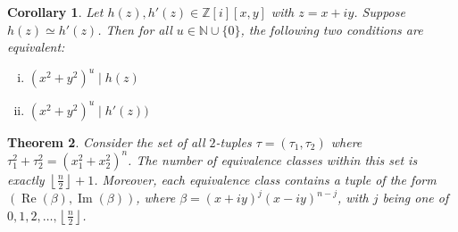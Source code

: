 \documentclass[12pt]{article}
\newtheorem{theorem}{Theorem}[section]
\newtheorem{corollary}[theorem]{Corollary}
\theoremstyle{definition}
\theoremstyle{remark}
\newcommand{\Nnn}{\mathbb N}
\newcommand{\Zzz}{\mathbb Z}
\newcommand{\vanish}[1]{}
\newcommand{\divides}{\mid}
\numberwithin{equation}{section}
\DeclareMathOperator{\Imag}{Im}
\DeclareMathOperator{\Real}{Re}
\begin{document}
\vanish{
\begin{corollary}
Let \( h(z), h'(z) \in \Zzz[i][x,y] \) with \( z = x+ iy \).
\[
h(z) \simeq h'(z) 
\implies 
( \forall u \in \Nnn \cup \{ 0 \},  ( x^2 + y^2 ) ^ u \divides h(z)  \iff ( x^2 + y^2 ) ^ u \divides h'(z)  )
\]
\end{corollary}
}

\begin{corollary}
\label{corollary_equivalence}
Let \( h(z), h'(z) \in \Zzz[i][x,y] \) with \( z = x+ iy \).
Suppose \( h(z) \simeq h'(z) \). Then for all  \( u \in \Nnn \cup \{ 0 \} \),
the following two conditions are
equivalent:
\begin{enumerate}[i.]
\item \( ( x^2 + y^2 ) ^ u \divides h(z) \)
\item \( ( x^2 + y^2 ) ^ u \divides h'(z)  ) \)
\end{enumerate}
\end{corollary}




\begin{theorem}
Consider the set of all \(2\)-tuples \( \tau = ( \tau_1, \tau_2 )\) where 
\(
  \tau_1 ^ 2   +   \tau_2 ^ 2   
= 
\left(  x_1 ^ 2 + x_2 ^ 2  \right) ^ n 
\).
The number of equivalence classes within this set 
is exactly  \( \left\lfloor \frac{n}{2} \right\rfloor + 1 \). 
Moreover, each equivalence class contains a tuple
of the form \( ( \Real( \beta ) , \Imag( \beta ) ) \),
where \( \beta = (x + iy)^j (x -  iy)^{n-j} \),
with \( j \)
being one of \( 0, 1, 2, \ldots, \left\lfloor \frac{n}{2} \right\rfloor \).
\end{theorem}
\end{document}
